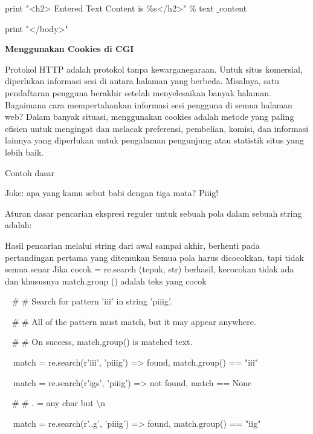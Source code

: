 \begin {enumerate}
\begin {enumerate}
\noindent
print "<h2> Entered Text Content is  $  \%  $s</h2>"  $  \%  $ text $  \_  $content \par
\noindent
print "</body>" \par
\vspace{12pt}
\noindent
{\fontsize{14pt}{14pt}\selectfont \textbf{Menggunakan Cookies di CGI} \\} \par
\noindent
Protokol HTTP adalah protokol tanpa kewarganegaraan. Untuk situs komersial, diperlukan informasi sesi di antara halaman yang berbeda. Misalnya, satu pendaftaran pengguna berakhir setelah menyelesaikan banyak halaman. Bagaimana cara mempertahankan informasi sesi pengguna di semua halaman web? Dalam banyak situasi, menggunakan cookies adalah metode yang paling efisien untuk mengingat dan melacak preferensi, pembelian, komisi, dan informasi lainnya yang diperlukan untuk pengalaman pengunjung atau statistik situs yang lebih baik. \par
\noindent
Contoh dasar \par
\noindent
Joke: apa yang kamu sebut babi dengan tiga mata? Piiig! \par
\vspace{12pt}
\noindent
Aturan dasar pencarian ekspresi reguler untuk sebuah pola dalam sebuah string adalah: \par
\noindent
Hasil pencarian melalui string dari awal sampai akhir, berhenti pada pertandingan pertama yang ditemukan  Semua pola harus dicocokkan, tapi tidak semua senar Jika cocok = re.search (tepuk, str) berhasil, kecocokan tidak ada dan khususnya match.group () adalah teks yang cocok \par
\vspace{12pt}
\noindent
~  $  \#  $ $  \#  $ Search for pattern 'iii' in string 'piiig'. \par
\noindent
~  $  \#  $ $  \#  $ All of the pattern must match, but it may appear anywhere. \par
\noindent
~  $  \#  $ $  \#  $ On success, match.group() is matched text. \par
\noindent
~~match = re.search(r'iii', 'piiig') =>  found, match.group() == "iii" \par
\noindent
~~match = re.search(r'igs', 'piiig') =>  not found, match == None \par
\vspace{12pt}
\noindent
~  $  \#  $ $  \#  $ . = any char but  $  \setminus  $n \par
\noindent
~~match = re.search(r'..g', 'piiig') =>  found, match.group() == "iig" \par

\end{enumerate}
\end{enumerate}
